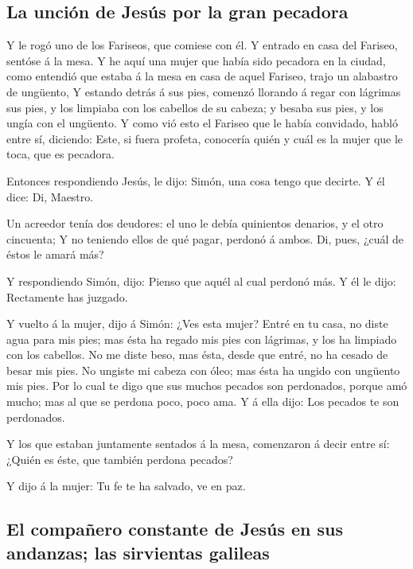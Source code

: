 \hypertarget{la-unciuxf3n-de-jesuxfas-por-la-gran-pecadora}{%
\subsection{La unción de Jesús por la gran
pecadora}\label{la-unciuxf3n-de-jesuxfas-por-la-gran-pecadora}}

 Y le rogó uno de los Fariseos, que comiese con él. Y
entrado en casa del Fariseo, sentóse á la mesa.  Y he
aquí una mujer que había sido pecadora en la ciudad, como entendió que
estaba á la mesa en casa de aquel Fariseo, trajo un alabastro de
ungüento,  Y estando detrás á sus pies, comenzó llorando
á regar con lágrimas sus pies, y los limpiaba con los cabellos de su
cabeza; y besaba sus pies, y los ungía con el ungüento. 
Y como vió esto el Fariseo que le había convidado, habló entre sí,
diciendo: Este, si fuera profeta, conocería quién y cuál es la mujer que
le toca, que es pecadora.

 Entonces respondiendo Jesús, le dijo: Simón, una cosa
tengo que decirte. Y él dice: Di, Maestro.

 Un acreedor tenía dos deudores: el uno le debía
quinientos denarios, y el otro cincuenta;  Y no teniendo
ellos de qué pagar, perdonó á ambos. Di, pues, ¿cuál de éstos le amará
más?

 Y respondiendo Simón, dijo: Pienso que aquél al cual
perdonó más. Y él le dijo: Rectamente has juzgado.

 Y vuelto á la mujer, dijo á Simón: ¿Ves esta mujer?
Entré en tu casa, no diste agua para mis pies; mas ésta ha regado mis
pies con lágrimas, y los ha limpiado con los cabellos. 
No me diste beso, mas ésta, desde que entré, no ha cesado de besar mis
pies.  No ungiste mi cabeza con óleo; mas ésta ha ungido
con ungüento mis pies.  Por lo cual te digo que sus
muchos pecados son perdonados, porque amó mucho; mas al que se perdona
poco, poco ama.  Y á ella dijo: Los pecados te son
perdonados.

 Y los que estaban juntamente sentados á la mesa,
comenzaron á decir entre sí: ¿Quién es éste, que también perdona
pecados?

 Y dijo á la mujer: Tu fe te ha salvado, ve en paz.

\hypertarget{el-compauxf1ero-constante-de-jesuxfas-en-sus-andanzas-las-sirvientas-galileas}{%
\subsection{El compañero constante de Jesús en sus andanzas; las
sirvientas
galileas}\label{el-compauxf1ero-constante-de-jesuxfas-en-sus-andanzas-las-sirvientas-galileas}}

